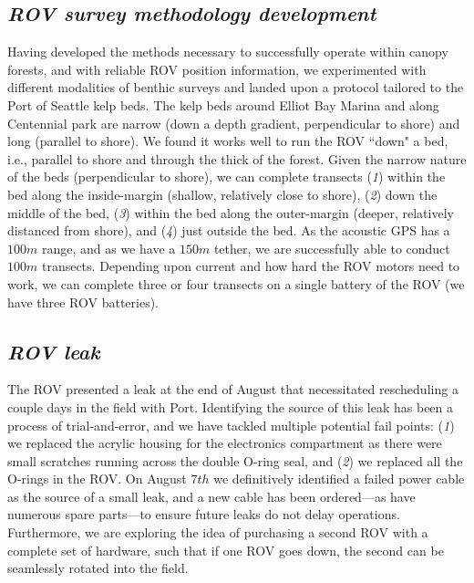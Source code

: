 \documentclass[11pt]{article}
\begin{document}
\subsection{\textit{ROV survey methodology development}}
Having developed the methods necessary to successfully operate within canopy forests, and with reliable ROV position information, we 
experimented with different modalities of benthic surveys and landed 
upon a protocol tailored to the Port of Seattle kelp beds. 
The kelp beds around Elliot Bay Marina and along Centennial park are 
narrow (down a depth gradient, perpendicular to shore) and long 
(parallel to shore). 
We found it works well to run the ROV ``down" a bed, i.e., parallel to 
shore and through the thick of the forest. 
Given the narrow nature of the beds (perpendicular to shore), we can 
complete transects 
(\textit{1}) within the bed along the inside-margin (shallow, 
relatively close to shore), 
(\textit{2}) down the middle of the bed, 
(\textit{3}) within the bed along the outer-margin (deeper, relatively 
distanced from shore), and 
(\textit{4}) just outside the bed.
As the acoustic GPS has a $100m$ range, and as we have a $150m$ tether, 
we are successfully able to conduct $100m$ transects.  
Depending upon current and how hard the ROV motors need to work, we can 
complete three or four transects on a single battery of the ROV (we 
have three ROV batteries).

\subsection{\textit{ROV leak}}
The ROV presented a leak at the end of August that necessitated rescheduling a couple days in the field with Port. 
Identifying the source of this leak has been a process of trial-and-error, and we have tackled multiple potential fail points: (\textit{1}) we replaced the acrylic housing for the electronics compartment as there were small scratches running across the double O-ring seal, and (\textit{2}) we replaced all the O-rings in the ROV. 
On August $7th$ we definitively identified a failed power cable as the source of a small leak, and a new cable has been ordered---as have numerous spare parts---to ensure future leaks do not delay operations. 
Furthermore, we are exploring the idea of purchasing a second ROV with 
a complete set of hardware, such that if one ROV goes down, the second 
can be seamlessly rotated into the field. 
\end{document}
